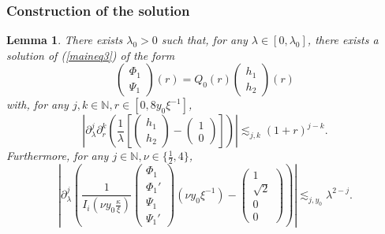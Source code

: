 \documentclass[11 pt]{amsart}
\newtheorem{lem}{Lemma}[section]
\theoremstyle{definition}
\theoremstyle{remark}
\numberwithin{equation}{section}
\begin{document}
\subsubsection{Construction of the solution}

\begin{lem}
  \label{latecheckout}There exists $\lambda_0 > 0$ such that, for any $\lambda
  \in [0, \lambda_0]$, there exists a solution of (\ref{maineq3}) of the form
  \[ \left(\begin{array}{c}
       \Phi_1\\
       \Psi_1
     \end{array}\right) (r) = Q_0 (r) \left(\begin{array}{c}
       h_1\\
       h_2
     \end{array}\right) (r) \]
  with, for any $j, k \in \mathbb{N}, r \in [0, 8 y_0 \xi^{- 1}]$,
  \[ \left| \partial_{\lambda}^j \partial_r^k \left(
     \frac{1}{\lambda} \left[\left(\begin{array}{c}
       h_1\\
       h_2
     \end{array}\right) - \left(\begin{array}{c}
       1\\
       0
     \end{array}\right) \right] \right) \right| \lesssim_{j, k} (1 + r)^{j -
     k} . \]
  Furthermore, for any $j \in \mathbb{N} , \nu \in \{ \frac 12,4 \}$,
  \[ \left| \partial_{\lambda}^j \left( \frac{1}{I_i \left( \nu y_0
     \frac{\kappa}{\xi} \right)} \left(\begin{array}{c}
       \Phi_1\\
       \Phi_1'\\
       \Psi_1\\
       \Psi_1'
     \end{array}\right) (\nu y_0\xi^{- 1}) - \left(\begin{array}{c}
       1\\
       \sqrt{2}\\
       0\\
       0
     \end{array}\right) \right) \right| \lesssim_{j,y_0} \lambda^{2-j} .
  \]
  \[ \  \]
\end{lem}
\end{document}
